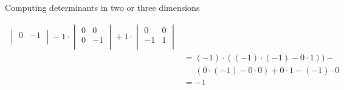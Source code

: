 \documentclass[notes]{beamer}
\begin{document}
\begin{frame}{Computing determinants in two or three dimensions}
{\begin{align}
\begin{vmatrix}
         0 & -1 \\
       \end{vmatrix}  
       -
       1 \cdot
       \begin{vmatrix}
        0 & 0  \\
        0 & -1 \\
       \end{vmatrix}  
      +
       1 \cdot
       \begin{vmatrix}
        0 & 0  \\
        -1 & 1  \\
       \end{vmatrix}  \\
       &= (-1) \cdot ((-1) \cdot (-1) - 0 \cdot 1)) - \\
       &\;\;\;\;\;  (0 \cdot (-1) - 0 \cdot 0) + 0 \cdot 1 -(-1) \cdot 0 \\
       &= -1
      \end{align}

    }
    \end{frame}
\end{document}
